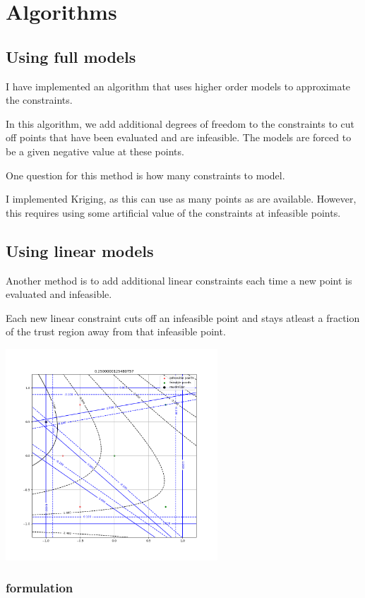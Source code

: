 
\section{Algorithms}


\subsection{Using full models}
I have implemented an algorithm that uses higher order models to approximate the constraints.

In this algorithm, we add additional degrees of freedom to the constraints to cut off points that have been evaluated and are infeasible.
The models are forced to be a given negative value at these points.

One question for this method is how many constraints to model.


I implemented Kriging, as this can use as many points as are available.
However, this requires using some artificial value of the constraints at infeasible points.

\subsection{Using linear models}

Another method is to add additional linear constraints each time a new point is evaluated and infeasible.

Each new linear constraint cuts off an infeasible point and stays atleast a fraction of the trust region away from that infeasible point.


\includegraphics[width=300px]{images/pyomo_cut_solution.png}

\subsubsection{formulation}

